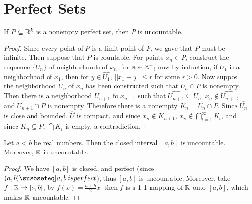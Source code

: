 
\section{Perfect Sets}

\begin{theorem}\label{2.4.1}
    If $P \subseteq \mathbb{R}^k$ is a nonempty perfect set, then  $P$ is uncountable.
\end{theorem}
\begin{proof}
    Since every point of $P$ is a limit point of  $P$, we gave that  $P$ must be infinite. 
    Then suppose that  $P$ is countable. For points  $x_n \in P$, construct the sequence 
    $\{U_n\}$ of neighborhoods of  $x_n$, for  $n \in \mathbb{Z}^+$; now by induction, if  $U_1$ is 
    a neighborhood of $x_1$, then for $y \in \hat{U_1}$, $||x_1-y|| \leq r$ for some $r>0$. 
    Now suppos the neighborhood $U_n$ of  $x_n$ has been constructed such that  $U_n \cap P$ 
    is nonempty. Then there is a neighborhood  $U_{n+1}$ fo  $x_{n+1}$ such that  
    $\hat{U_{n+1}} \subseteq U_n$,  $x_n \notin \hat{U_{n+1}}$, and  $U_{n+1} \cap P$ is nonempty. 
    Therefore there is a  nonempty $K_n=U_n \cap P$. Since  $\hat{U_n}$ is close and 
    bounded, $\hat{U}$ is compact, and since  $x_n \notin K_{n+1}$,  $x_n \notin \bigcap_{i=1}^{\infty}{K_i}$, 
    and since  $K_n \subseteq P$,  $\bigcap{K_i}$ is empty, a contradiction.
\end{proof}

\begin{corollary}
    Let $a<b$ be real numbers. Then the closed interval  $[a,b]$ is uncountable. 
    Moreover,  $\mathbb{R}$ is uncountable.
\end{corollary}
\begin{proof}
    We have $[a,b]$ is closed, and perfect (since $(a,b) \susbseteq [a,b] is perfect$), 
    thus $[a,b]$ is uncountable. Moreover, take  $f:\mathbb{R} \rightarrow [a,b]$, by 
    $f(x)=\frac{a+b}{2}x$; then $f$ is a 1-1 mapping of  $\mathbb{R}$ onto  $[a,b]$, which makes 
     $\mathbb{R}$ uncountable.
\end{proof}

